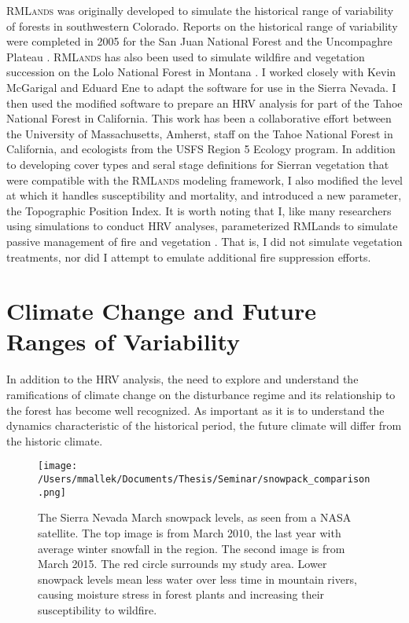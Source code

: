 \textsc{RMLands} was originally developed to simulate the historical range of variability of forests in southwestern Colorado. Reports on the historical range of variability were completed in 2005 for the San Juan National Forest and the Uncompaghre Plateau \citep{McGarigal2005,McGarigal2005a}. \textsc{RMLands} has also been used to simulate wildfire and vegetation succession on the Lolo National Forest in Montana \citep{Cushman2011}. I worked closely with Kevin McGarigal and Eduard Ene to adapt the software for use in the Sierra Nevada. I then used the modified software to prepare an HRV analysis for part of the Tahoe National Forest in California. This work has been a collaborative effort between the University of Massachusetts, Amherst, staff on the Tahoe National Forest in California, and ecologists from the USFS Region 5 Ecology program. In addition to developing cover types and seral stage definitions for Sierran vegetation that were compatible with the \textsc{RMLands} modeling framework, I also modified the level at which it handles susceptibility and mortality, and introduced a new parameter, the Topographic Position Index. It is worth noting that I, like many researchers using simulations to conduct HRV analyses, parameterized RMLands to simulate passive management of fire and vegetation \citep{Wimberly2002,Nonaka2005,McGarigal2012}. That is, I did not simulate vegetation treatments, nor did I attempt to emulate additional fire suppression efforts.










\section{Climate Change and Future Ranges of Variability}

In addition to the HRV analysis, the need to explore and understand the ramifications of climate change on the disturbance regime and its relationship to the forest has become well recognized. As important as it is to understand the dynamics characteristic of the historical period, the future climate will differ from the historic climate. 
%
\begin{figure}[!htbp]
\centering
\texttt{[image: /Users/mmallek/Documents/Thesis/Seminar/snowpack\_comparison.png]}
\caption{The Sierra Nevada March snowpack levels, as seen from a NASA satellite. The top image is from March 2010, the last year with average winter snowfall in the region. The second image is from March 2015. The red circle surrounds my study area. Lower snowpack levels mean less water over less time in mountain rivers, causing moisture stress in forest plants and increasing their susceptibility to wildfire.
}
\label{fig:satellitesnowpack}
\end{figure}

